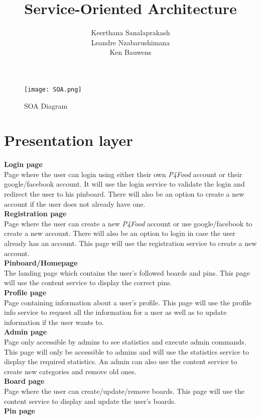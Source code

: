 \documentclass[a4paper]{article}
\title{Service-Oriented Architecture}
\author{Keerthana Sanalaprakash \\ Leandre Nzabarushimana \\ Ken Bauwens}
\begin{document}
\maketitle
\pagebreak
\begin{figure}[h]
    \centering
    \texttt{[image: SOA.png]}
    \caption{SOA Diagram}
    \label{fig:mesh1}
\end{figure}

\section{Presentation layer}
\textbf{Login page}
\\Page where the user can login using either their own \textit{P4Food} account or their google/facebook account. It will use the login service to validate the login and redirect the user to his pinboard. There will also be an option to create a new account if the user does not already have one.
\\[10px] \textbf{Registration page}
\\Page where the user can create a new \textit{P4Food} account or use google/facebook to create a new account. There will also be an option to login in case the user already has an account. This page will use the registration service to create a new account.
\\[10px] \textbf{Pinboard/Homepage}
\\The landing page which contains the user's followed boards and pins. This page will use the  content service to display the correct pins. 
\\[10px] \textbf{Profile page}
\\Page containing information about a user's profile. This page will use the profile info service to request all the information for a user as well as to update information if the user wants to.
\\[10px] \textbf{Admin page}
\\Page only accessible by admins to see statistics and execute admin commands. This page will only be accessible to admins and will use the statistics service to display the required statistics. An admin can also use the content service to create new categories and remove old ones.
\\[10px] \textbf{Board page}
\\Page where the user can create/update/remove boards. This page will use the content service to display and update the user's boards.
\\[10px] \textbf{Pin page}
\end{document}
